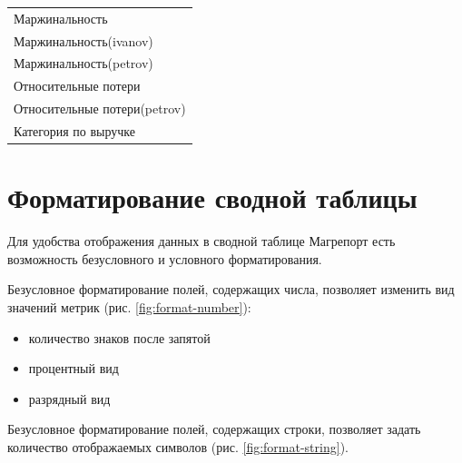 \documentclass[../user-manual.tex]{subfiles}
\begin{document}
	\begin{tabular}{l}
		
		Маржинальность\\
		
		Маржинальность(ivanov)\\
		
		Маржинальность(petrov)\\
		
		Относительные потери\\
		
		Относительные потери(petrov)\\
		
		Категория по выручке\\
		
	\end{tabular}
	
	
	\section{Форматирование сводной таблицы}
	
	Для удобства отображения данных в сводной таблице Магрепорт есть возможность безусловного и условного форматирования.
	
	Безусловное форматирование полей, содержащих числа, позволяет изменить вид значений метрик (рис. \ref{fig:format-number}):
	\begin{itemize}
		
		\item количество знаков после запятой
		
		\item процентный вид
		
		\item разрядный вид
	\end{itemize}

	Безусловное форматирование полей, содержащих строки, позволяет задать количество отображаемых символов (рис. \ref{fig:format-string}).
	
\end{document}
